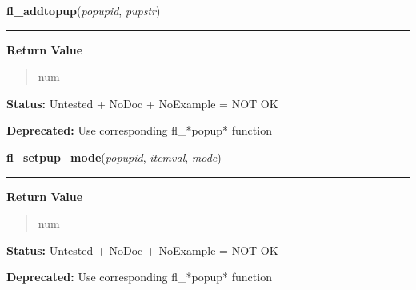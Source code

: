     \label{xformslib:deprecated:fl_addtopup}

    \vspace{0.5ex}

\hspace{.8\funcindent}\begin{boxedminipage}{\funcwidth}

    \raggedright \textbf{fl\_addtopup}(\textit{popupid}, \textit{pupstr})

    \vspace{-1.5ex}

    \rule{\textwidth}{0.5\fboxrule}
\setlength{\parskip}{2ex}
\setlength{\parskip}{1ex}
      \textbf{Return Value}
    \vspace{-1ex}

      \begin{quote}
      num

      \end{quote}

\textbf{Status:} Untested + NoDoc + NoExample = NOT OK



\textbf{Deprecated:} Use corresponding fl\_*popup* function



    \end{boxedminipage}

    \label{xformslib:deprecated:fl_setpup_mode}

    \vspace{0.5ex}

\hspace{.8\funcindent}\begin{boxedminipage}{\funcwidth}

    \raggedright \textbf{fl\_setpup\_mode}(\textit{popupid}, \textit{itemval}, \textit{mode})

    \vspace{-1.5ex}

    \rule{\textwidth}{0.5\fboxrule}
\setlength{\parskip}{2ex}
\setlength{\parskip}{1ex}
      \textbf{Return Value}
    \vspace{-1ex}

      \begin{quote}
      num

      \end{quote}

\textbf{Status:} Untested + NoDoc + NoExample = NOT OK



\textbf{Deprecated:} Use corresponding fl\_*popup* function



    \end{boxedminipage}


